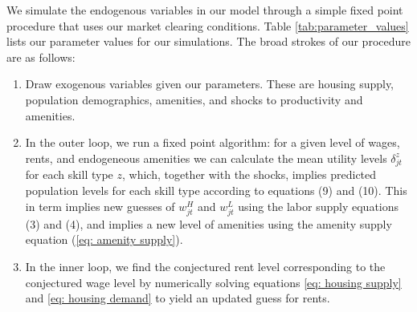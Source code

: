 \documentclass{article}
\begin{document}
We simulate the endogenous variables in our model through a simple fixed point procedure that uses our market clearing conditions. Table \ref{tab:parameter_values} lists our parameter values for our simulations. The broad strokes of our procedure are as follows: 
\begin{enumerate}
\item Draw exogenous variables given our parameters. These are housing supply, population demographics, amenities, and shocks to productivity and amenities. 
\item In the outer loop, we run a fixed point algorithm: for a given level of wages,  rents, and endogeneous amenities we can calculate the mean utility levels $\delta^z_{jt}$ for each skill type $z$, which, together with the shocks, implies predicted population levels for each skill type according to equations (9) and (10). This in term implies new guesses of $w^H_{jt}$ and $w^L_{jt}$ using the labor supply equations (3) and (4), and implies a new level of amenities using the amenity supply equation (\ref{eq: amenity supply}).

\item In the inner loop, we find the conjectured rent level corresponding to the conjectured wage level by numerically solving equations \ref{eq: housing supply} and \ref{eq: housing demand} to yield an updated guess for rents. 
\end{enumerate}
\end{document}
